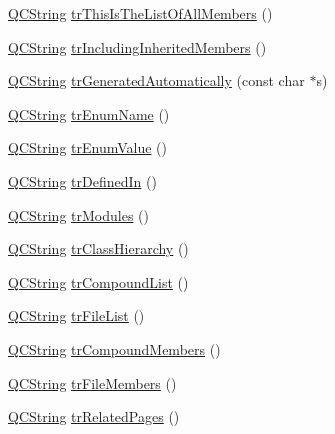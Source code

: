\begin{DoxyCompactItemize}
\item 
\mbox{\hyperlink{class_q_c_string}{Q\+C\+String}} \mbox{\hyperlink{class_translator_italian_af478fd19300caf8566bb4966309110f3}{tr\+This\+Is\+The\+List\+Of\+All\+Members}} ()
\item 
\mbox{\hyperlink{class_q_c_string}{Q\+C\+String}} \mbox{\hyperlink{class_translator_italian_ac3f003e5c0bbf155e120662d20888800}{tr\+Including\+Inherited\+Members}} ()
\item 
\mbox{\hyperlink{class_q_c_string}{Q\+C\+String}} \mbox{\hyperlink{class_translator_italian_ae6721e66d3e51c5e62f878b6540973eb}{tr\+Generated\+Automatically}} (const char $\ast$s)
\item 
\mbox{\hyperlink{class_q_c_string}{Q\+C\+String}} \mbox{\hyperlink{class_translator_italian_af11ce97e00cee2962714f3aafe65464d}{tr\+Enum\+Name}} ()
\item 
\mbox{\hyperlink{class_q_c_string}{Q\+C\+String}} \mbox{\hyperlink{class_translator_italian_ac29baf0cffb2425dafd6203b18b9ede7}{tr\+Enum\+Value}} ()
\item 
\mbox{\hyperlink{class_q_c_string}{Q\+C\+String}} \mbox{\hyperlink{class_translator_italian_ab93c953a0b074e32fa9e68479255684c}{tr\+Defined\+In}} ()
\item 
\mbox{\hyperlink{class_q_c_string}{Q\+C\+String}} \mbox{\hyperlink{class_translator_italian_a470865fa054fb36f1580244708464b9a}{tr\+Modules}} ()
\item 
\mbox{\hyperlink{class_q_c_string}{Q\+C\+String}} \mbox{\hyperlink{class_translator_italian_ae2cf28022bedf22c63e046c3b87689e5}{tr\+Class\+Hierarchy}} ()
\item 
\mbox{\hyperlink{class_q_c_string}{Q\+C\+String}} \mbox{\hyperlink{class_translator_italian_a1a170cff07e299c220405d026896ff42}{tr\+Compound\+List}} ()
\item 
\mbox{\hyperlink{class_q_c_string}{Q\+C\+String}} \mbox{\hyperlink{class_translator_italian_aa24c0daac87d64626241a17e82f03262}{tr\+File\+List}} ()
\item 
\mbox{\hyperlink{class_q_c_string}{Q\+C\+String}} \mbox{\hyperlink{class_translator_italian_abdee079362125a06eb45f3c34ceef927}{tr\+Compound\+Members}} ()
\item 
\mbox{\hyperlink{class_q_c_string}{Q\+C\+String}} \mbox{\hyperlink{class_translator_italian_a063f0ec757fea0803faac6701088ff81}{tr\+File\+Members}} ()
\item 
\mbox{\hyperlink{class_q_c_string}{Q\+C\+String}} \mbox{\hyperlink{class_translator_italian_aa5462f64304452c2eabe4b42965beba4}{tr\+Related\+Pages}} ()

\end{DoxyCompactItemize}
